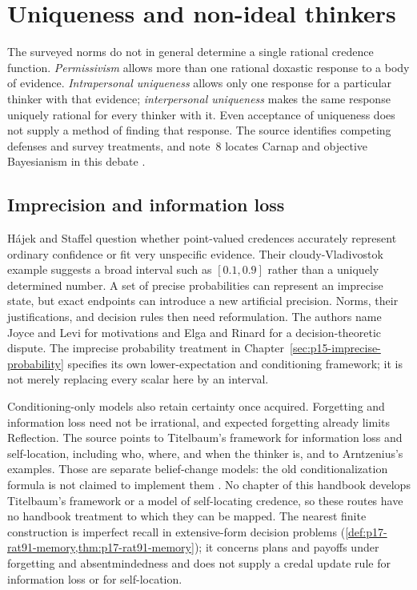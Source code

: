\section{Uniqueness and non-ideal thinkers}
\label{sec:p15-rat41-nonideal}

The surveyed norms do not in general determine a single rational
credence function. \emph{Permissivism} allows more than one rational
doxastic response to a body of evidence. \emph{Intrapersonal uniqueness}
allows only one response for a particular thinker with that evidence;
\emph{interpersonal uniqueness} makes the same response uniquely rational
for every thinker with it. Even acceptance of uniqueness does not supply
a method of finding that response. The source identifies competing
defenses and survey treatments, and note~8 locates Carnap and objective
Bayesianism in this debate
\parencite[pp.~245--246 and p.~248, n.~8]{HajekStaffel2021Dynamics}.

\subsection{Imprecision and information loss}

H\'ajek and Staffel question whether point-valued credences accurately
represent ordinary confidence or fit very unspecific evidence. Their
cloudy-Vladivostok example suggests a broad interval such as
\([0.1,0.9]\) rather than a uniquely determined number. A set of precise
probabilities can represent an imprecise state, but exact endpoints can
introduce a new artificial precision. Norms, their justifications, and
decision rules then need reformulation. The authors name Joyce and Levi
for motivations and Elga and Rinard for a decision-theoretic dispute.
The imprecise probability treatment in
Chapter~\ref{sec:p15-imprecise-probability} specifies its own lower-expectation
and conditioning framework; it is not merely replacing every scalar
here by an interval.

Conditioning-only models also retain certainty once acquired. Forgetting
and information loss need not be irrational, and expected forgetting
already limits Reflection. The source points to Titelbaum's framework
for information loss and self-location, including who, where, and when
the thinker is, and to Arntzenius's examples. Those are separate belief-change
models: the old conditionalization formula is not claimed to implement
them
\parencite[p.~246]{HajekStaffel2021Dynamics}.
No chapter of this handbook develops Titelbaum's framework or a model of
self-locating credence, so these routes have no handbook treatment to which
they can be mapped. The nearest finite construction is imperfect recall in
extensive-form decision problems
(\cref{def:p17-rat91-memory,thm:p17-rat91-memory}); it concerns plans and
payoffs under forgetting and absentmindedness and does not supply a credal
update rule for information loss or for self-location.


